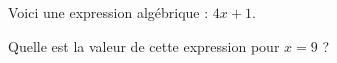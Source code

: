 
Voici une expression algébrique : $4x+1$.

Quelle est la valeur de cette expression pour $x=9$ ?

\smallskip
{}
